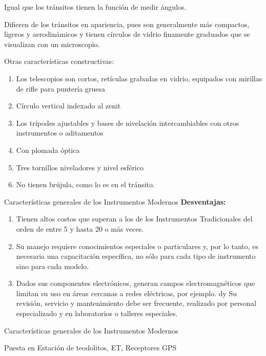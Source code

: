 Igual que los tránsitos tienen la función de medir ángulos.

Difieren de los tránsitos en apariencia, pues son generalmente más compactos, ligeros y aerodinámicos y tienen círculos de vidrio finamente graduados que se visualizan con un
microscopio.

Otras características constructivas: 

\begin{enumerate}
    \item Los telescopios son cortos, retículas grabadas en vidrio, equipados con mirillas de rifle para puntería gruesa
    \item Círculo vertical indexado al zenit
    \item Los trípodes ajustables y bases de nivelación intercambiables con otros instrumentos o aditamentos
    \item Con plomada óptica
    \item Tres tornillos niveladores y nivel esférico
    \item No tienen brújula, como lo es en el tránsito.
\end{enumerate}

Características generales de los Instrumentos Modernos
\textbf{Desventajas:}
\begin{enumerate}
    \item Tienen altos costos que superan a los de los Instrumentos Tradicionales del orden de entre 5 y hasta 20 o más veces. 
    \item Su manejo requiere conocimientos especiales o particulares y, por lo tanto, es necesaria una capacitación específica, no sólo para cada tipo de instrumento sino para cada modelo.
    \item Dados sus componentes electrónicos, generan campos electromagnéticos que limitan su uso en áreas cercanas a redes eléctricas, por ejemplo. dy Su revisión, servicio y mantenimiento debe ser frecuente, realizado por personal especializado y en laboratorios o talleres especiales.
\end{enumerate}

Características generales de los Instrumentos Modernos

Puesta en Estación de teodolitos, ET, Receptores GPS

